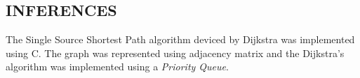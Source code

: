 	\subsection{INFERENCES}
		\par The Single Source Shortest Path algorithm deviced by Dijkstra was implemented using C. The graph was represented using adjacency matrix and the Dijkstra's algorithm was implemented using a \emph{Priority Queue}.

\newpage  %